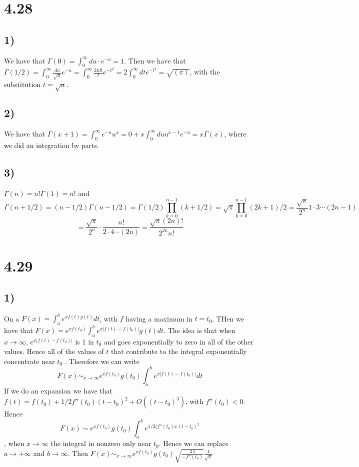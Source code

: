 \documentclass[10pt,a4paper]{book}
\begin{document}
\section*{4.28}

\subsection*{1)}We have that $\Gamma(0)=\int_0^{\infty} du\cdot  e^{-u}= 1$. Then we have that $\Gamma(1/2)=\int_0^{\infty} \frac{du}{\sqrt{u}}e^{-u}=\int_{0}^{\infty} \frac{2t dt}{t} e^{-t^2}=2\int_0^{\infty} dt e^{-t^2}=\sqrt{(\pi)}$, with the substitution $t=\sqrt{u}$. 
\subsection*{2)}
We have that $\Gamma(x+1)=\int_0^{\infty} e^{-u} u^x=0+x\int_0^{\infty} du u^{x-1} e^{-u}=x\Gamma(x)$, where we did an integration by parts.

\subsection*{3)}

$\Gamma(n)=n!\Gamma(1)=n!$ and 
$$
\Gamma(n+1/2)=(n-1/2)\Gamma(n-1/2)=\Gamma(1/2)\prod_{k=0}^{n-1}(k+1/2)=\sqrt{\pi}\prod_{k=0}^{n-1} (2k+1)/2=\frac{\sqrt{\pi}}{2^n}1\cdot3\cdots(2n-1)$$
$$=\frac{\sqrt{\pi}}{2^n}\cdot\frac{n!}{2\cdot 4\cdots (2n)}=\frac{\sqrt{\pi}(2n)!}{2^{2n}n!}
$$

\section*{4.29}

\subsection*{1)}
On a $F(x)=\int_a^b e^{xf(t)g(t)}dt$, with $f$ having a maximum in $t=t_0$. THen we have that $F(x)=e^{xf(t_0)}\int_a^b e^{x|f(t)-f(t_0)|}g(t)dt$. The idea is that when $x\to\infty$, $e^{x|f(t)-f(t_0)|}$ is 1 in $t_0$ and goes exponentially to zero in all of the other values.  Hence all of the values of $t$ that contribute to the integral exponentially concentrate near $t_0$ . Therefore we can write 
$$F(x)\sim_{x\to\infty} e^{xf(t_0)}g(t_0)\int_a^b e^{x|f(t)-f(t_0)|}dt$$ If we do an expansion we have that $f(t)=f(t_0)+1/2f''(t_0)(t-t_0)^2+O((t-t_0)^3)$, with $f''(t_0)<0$. Hence 
$$F(x)\sim e^{xf(t_0)}g(t_0)\int_a^b e^{1/2(f''(t_0)x(t-t_0)^2}$$, when $x\to\infty$ the integral in nonzero only near $t_0$. Hence we can replace $a\to +\infty$ and $b\to\infty$. Then $F(x)\sim_{x\to\infty} e^{xf(t_0)}g(t_0)\sqrt{\frac{2\pi}{-f''(t_0)}}\frac{1}{\sqrt{x}}$
\end{document}
